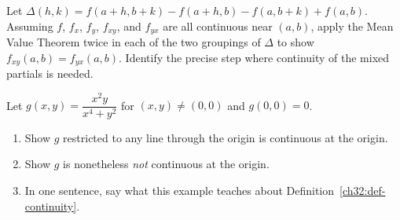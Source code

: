 \begin{exercise}
\label{ch32:exc-proof}
Let $\Delta(h,k) = f(a+h,b+k) - f(a+h,b) - f(a,b+k) + f(a,b)$. Assuming $f$, $f_x$, $f_y$,
$f_{xy}$, and $f_{yx}$ are all continuous near $(a,b)$, apply the Mean Value Theorem twice in
each of the two groupings of $\Delta$ to show $f_{xy}(a,b)=f_{yx}(a,b)$. Identify the precise
step where continuity of the mixed partials is needed.
\end{exercise}

\begin{exercise}
\label{ch32:exc-pathology}
Let $g(x,y)=\dfrac{x^2 y}{x^4+y^2}$ for $(x,y)\neq(0,0)$ and $g(0,0)=0$.
\begin{enumerate}[label=(\alph*)]
  \item Show $g$ restricted to any line through the origin is continuous at the origin.
  \item Show $g$ is nonetheless \emph{not} continuous at the origin.
  \item In one sentence, say what this example teaches about
  Definition~\ref{ch32:def-continuity}.
\end{enumerate}
\end{exercise}
